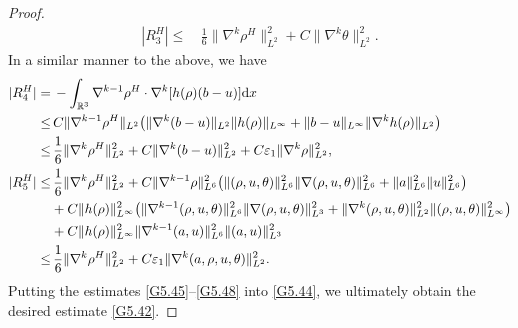 \documentclass[reqno,11pt]{amsart}
\theoremstyle{plain}
\numberwithin{equation}{section}
\newcommand{\eps}{{\varepsilon}}
\begin{document}
\begin{proof}
\begin{align}
|R^H_3|\leq &\,\frac{1}{6} \|\nabla^k \rho^H\|_{L^2}^2+C\|\nabla^k \theta\|_{L^2}^2.\label{G5.46}
\end{align}
In a similar manner to the above, we have
\begin{align}
|R^H_4| =&\, -\int_{\mathbb{R}^3} \nabla^{k-1}\rho^H \cdot\nabla^{k} [h(\rho)(b-u)]{\rm d}x\nonumber\\
\leq&\, C\|\nabla^{k-1}\rho^H\|_{L^2}\big( \|\nabla^k(b-u)\|_{L^2}\|h(\rho)\|_{L^\infty}+\|b-u\|_{L^\infty}\|\nabla^k h(\rho)\|_{L^2}    \big)\nonumber\\
\leq&\, \frac{1}{6}\|\nabla^k \rho^H\|_{L^2}^2+C\|\nabla^k(b-u)\|_{L^2}^2+C\eps_1 \|\nabla^k \rho\|_{L^2}^2,\label{G5.47-1}\\
|R^H_5|\leq&\,  \frac{1}{6}\|\nabla^{k} \rho^H\|_{L^2}^2+C\|\nabla^{k-1}\rho\|_{L^6}^2\big(\|(\rho,u,\theta)\|_{L^6}^2\|\nabla(\rho,u,\theta)\|_{L^6}^2+\|a\|_{L^6}^2\|u\|_{L^6}^2 
 \big)\nonumber\\
&+C\|h(\rho)\|_{L^\infty}^2\big(\|\nabla^{k-1}(\rho,u,\theta)\|_{L^6}^2\|\nabla(\rho,u,\theta)\|_{L^3}^2+\|\nabla^k(\rho,u,\theta)\|_{L^2}^2\|(\rho,u,\theta)\|_{L^\infty}^2  \big) \nonumber\\
&+C\|h(\rho)\|_{L^\infty}^2\|\nabla^{k-1}(a,u)\|_{L^6}^2\|(a,u)\|_{L^3}^2\nonumber\\
\leq&\, \frac{1}{6}\|\nabla^{k} \rho^H\|_{L^2}^2+C\eps_1 \|\nabla^k(a,\rho,u,\theta)\|_{L^2}^2.\label{G5.48}
\end{align}
Putting the estimates \eqref{G5.45}--\eqref{G5.48} into \eqref{G5.44}, we ultimately obtain the desired estimate \eqref{G5.42}.
\end{proof}
\end{document}
